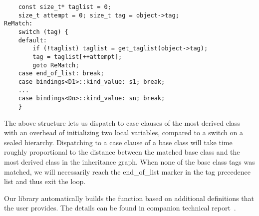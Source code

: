 \begin{lstlisting}
    const size_t* taglist = 0;
    size_t attempt = 0; size_t tag = object->tag;
ReMatch:
    switch (tag) {
    default:
        if (!taglist) taglist = get_taglist(object->tag);
        tag = taglist[++attempt];
        goto ReMatch;
    case end_of_list: break;
    case bindings<D1>::kind_value: s1; break;
    ...
    case bindings<Dn>::kind_value: sn; break;
    }
\end{lstlisting}

\noindent
The above structure lets us dispatch to case clauses of the most derived class 
with an overhead of initializing two local variables, compared to a switch on a 
sealed hierarchy. Dispatching to a case clause of a base class will take time 
roughly proportional to the distance between the matched base class and the most 
derived class in the inheritance graph. When none of the base class tags was 
matched, we will necessarily reach the end\_of\_list marker in the tag precedence 
list and thus exit the loop.

Our library automatically builds the function  based on 
additional definitions that the user provides. The details can be found in 
companion technical report~\cite{TR}.
